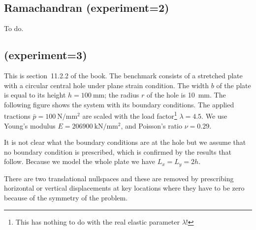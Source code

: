 \subsection*{Ramachandran (experiment=2)}

To do.


\newpage
\subsection*{\textcite{rarr03} (experiment=3)}

This is section~11.2.2 of the book.
The benchmark consists of a stretched plate with a circular central hole under plane strain condition. 
The width $b$ of the plate is 
equal to its height $h = \SI{100}{\mm}$; the radius $r$ of the hole is \SI{10}{\mm}. 
The following figure shows the system with its boundary conditions. The applied tractions 
$\bar{p} = \SI{100}{\newton\per\square\mm}$ are scaled with the load factor\footnote{This has 
nothing to do with the real elastic parameter $\lambda$!} $\lambda=4.5$.
We use Young's modulus $E = \SI{206 900}{\kilo\newton\per\square\mm}$, and Poisson's ratio $\nu = 0.29$.

It is not clear what the boundary conditions are at the hole but we assume that no boundary
condition is prescribed, which is confirmed by the results that follow.
Because we model the whole plate we have $L_x=L_y=2h$.

There are two translational nullspaces and these are removed by 
prescribing horizontal or vertical displacements at key locations
where they have to be zero because of the symmetry of the problem.

